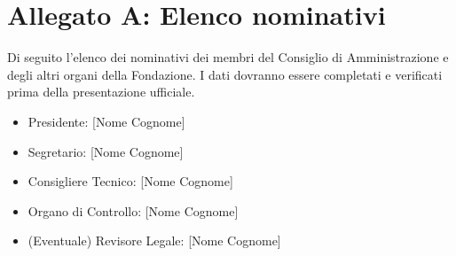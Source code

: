 
\section*{Allegato A: Elenco nominativi}

Di seguito l'elenco dei nominativi dei membri del Consiglio di Amministrazione e degli altri organi della Fondazione. I dati dovranno essere completati e verificati prima della presentazione ufficiale.

\begin{itemize}
  \item Presidente: [Nome Cognome]
  \item Segretario: [Nome Cognome]
  \item Consigliere Tecnico: [Nome Cognome]
  \item Organo di Controllo: [Nome Cognome]
  \item (Eventuale) Revisore Legale: [Nome Cognome]
\end{itemize}

